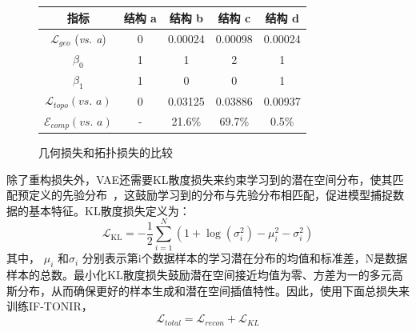 \begin{figure}[htbp]
    \\
    \hspace{0.1cm}
    \hspace{0.1cm}
    \hspace{0.1cm}
    \\
    \vspace{0.2cm}
    \renewcommand{\arraystretch}{1.2}
    \begin{tabular}{c|c|c|c|c}
        \hline
        \textbf{指标}                     & \textbf{结构 a} & \textbf{结构 b} & \textbf{结构 c} & \textbf{结构 d} \\
        \hline
        $\mathcal{L}_{geo}$ (\textit{vs. a})  & 0                    & 0.00024              & 0.00098              & 0.00024              \\
        \hline
        $\beta_0$                             & 1                    & 1                    & 2                    & 1                    \\
        \hline
        $\beta_1$                             & 1                    & 0                    & 0                    & 1                    \\
        \hline
        $\mathcal{L}_{topo} (\textit{vs. a})$ & 0                    & 0.03125              & 0.03886              & 0.00937              \\
        \hline
        $\mathcal{E}_{comp} (\textit{vs. a})$ & -                    & 21.6\%               & 69.7\%               & 0.5\%                \\
        \hline
    \end{tabular}
    \caption{几何损失和拓扑损失的比较}
    \label{fig:loss_compare}
\end{figure}

除了重构损失外，VAE还需要KL散度损失来约束学习到的潜在空间分布，使其匹配预定义的先验分布~\cite{kingma2019introduction}，这鼓励学习到的分布与先验分布相匹配，促进模型捕捉数据的基本特征。KL散度损失定义为：
\begin{equation}
    \mathcal{L}_{\text{KL}} = -\frac{1}{2} \sum_{i=1}^{N}(1 + \log(\sigma_i^2) - \mu_i^2 - \sigma_i^2)
\end{equation}
其中， $\mu_i$ 和$\sigma_i$ 分别表示第i个数据样本的学习潜在分布的均值和标准差，N是数据样本的总数。最小化KL散度损失鼓励潜在空间接近均值为零、方差为一的多元高斯分布，从而确保更好的样本生成和潜在空间插值特性。因此，使用下面总损失来训练IF-TONIR，
\begin{equation}
    \mathcal{L}_{total}=\mathcal{L}_{recon}+\mathcal{L}_{KL}
\end{equation}

